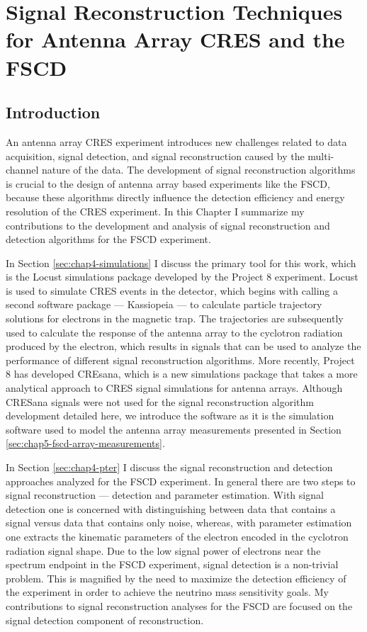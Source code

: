 \chapter{Signal Reconstruction Techniques for Antenna Array CRES and the FSCD}

\section{Introduction}

An antenna array CRES experiment introduces new challenges related to data acquisition, signal detection, and signal reconstruction caused by the multi-channel nature of the data. The development of signal reconstruction algorithms is crucial to the design of antenna array based experiments like the FSCD, because these algorithms directly influence the detection efficiency and energy resolution of the CRES experiment. In this Chapter I summarize my contributions to the development and analysis of signal reconstruction and detection algorithms for the FSCD experiment.

In Section \ref{sec:chap4-simulations} I discuss the primary tool for this work, which is the Locust simulations package developed by the Project 8 experiment. Locust is used to simulate CRES events in the detector, which begins with calling a second software package --- Kassiopeia --- to calculate particle trajectory solutions for electrons in the magnetic trap. The trajectories are subsequently used to calculate the response of the antenna array to the cyclotron radiation produced by the electron, which results in signals that can be used to analyze the performance of different signal reconstruction algorithms. More recently, Project 8 has developed CREsana, which is a new simulations package that takes a more analytical approach to CRES signal simulations for antenna arrays. Although CRESana signals were not used for the signal reconstruction algorithm development detailed here, we introduce the software as it is the simulation software used to model the antenna array measurements presented in Section \ref{sec:chap5-fscd-array-measurements}.

In Section \ref{sec:chap4-pter} I discuss the signal reconstruction and detection approaches analyzed for the FSCD experiment. In general there are two steps to signal reconstruction --- detection and parameter estimation. With signal detection one is concerned with distinguishing between data that contains a signal versus data that contains only noise, whereas, with parameter estimation one extracts the kinematic parameters of the electron encoded in the cyclotron radiation signal shape. Due to the low signal power of electrons near the spectrum endpoint in the FSCD experiment, signal detection is a non-trivial problem. This is magnified by the need to maximize the detection efficiency of the experiment in order to achieve the neutrino mass sensitivity goals. My contributions to signal reconstruction analyses for the FSCD are focused on the signal detection component of reconstruction.

